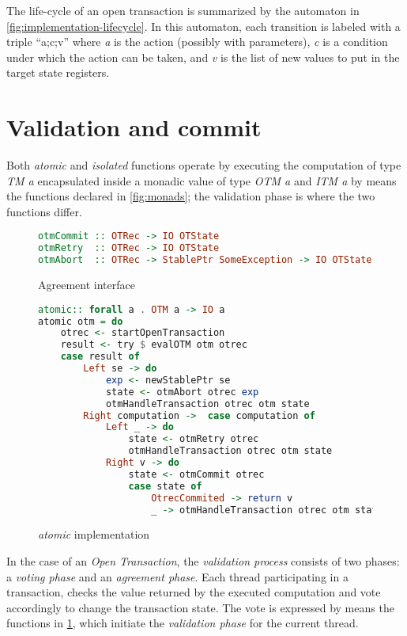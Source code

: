 The life-cycle of an open transaction is summarized by the automaton in \cref{fig:implementation-lifecycle}.
In this automaton, each transition is labeled with a triple ``a;c;v'' where \emph{a} is the action (possibly with parameters), \emph{c} is a condition under which the action can be taken, and \emph{v} is the list of new values to put in the target state registers.



\section{Validation and commit}

Both \emph{atomic} and \emph{isolated} functions operate by executing the computation of type \emph{TM a} encapsulated inside a monadic value of type \emph{OTM a} and \emph{ITM a} by means the functions declared in \cref{fig:monads}; the validation phase is where the two functions differ.

\begin{figure}
\begin{lstlisting}[language=Haskell,showlines=false]
otmCommit :: OTRec -> IO OTState
otmRetry  :: OTRec -> IO OTState
otmAbort  :: OTRec -> StablePtr SomeException -> IO OTState
\end{lstlisting}
\caption{Agreement interface}
\label{fig:agreement}
\end{figure}

\begin{figure}
\begin{lstlisting}[language=Haskell]
atomic:: forall a . OTM a -> IO a
atomic otm = do
    otrec <- startOpenTransaction
    result <- try $ evalOTM otm otrec
    case result of
        Left se -> do
            exp <- newStablePtr se
            state <- otmAbort otrec exp
            otmHandleTransaction otrec otm state
        Right computation ->  case computation of
            Left _ -> do
                state <- otmRetry otrec
                otmHandleTransaction otrec otm state
            Right v -> do
                state <- otmCommit otrec
                case state of
                    OtrecCommited -> return v
                    _ -> otmHandleTransaction otrec otm state
\end{lstlisting}
\caption{\emph{atomic} implementation}
\label{fig:atomic}
\end{figure}

In the case of an \emph{Open Transaction}, the \emph{validation process} consists of two phases: a \emph{voting phase} and an \emph{agreement phase}.
Each thread participating in a transaction, checks the value returned by the executed computation and vote accordingly to change the transaction state. The vote is expressed by means the functions in \cref{fig:agreement}, which initiate the \emph{validation phase} for the current thread.

